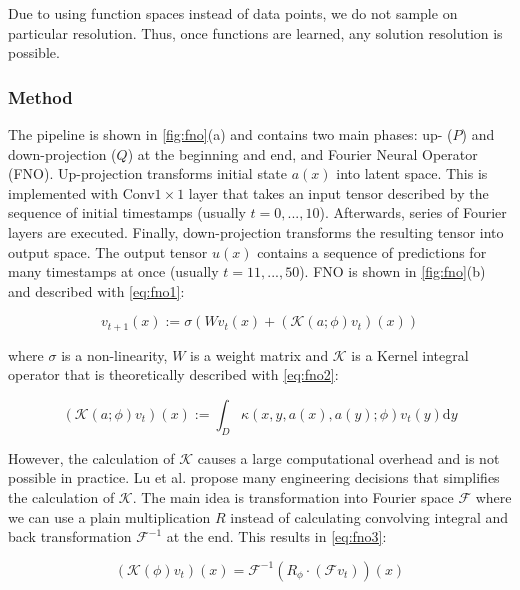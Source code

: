 Due to using function spaces instead of data points, we do not sample on particular resolution. Thus, once functions are learned, any solution resolution is possible. 

\subsubsection{Method}
\label{fno:method}
The pipeline is shown in \cref{fig:fno}(a) and contains two main phases: up- ($P$) and down-projection ($Q$) at the beginning and end, and Fourier Neural Operator (FNO). Up-projection transforms initial state $a(x)$ into latent space. This is implemented with Conv$1\times1$ layer that takes an input tensor described by the sequence of initial timestamps (usually $t=0,...,10$). Afterwards, series of Fourier layers are executed. Finally, down-projection transforms the resulting tensor into output space. The output tensor $u(x)$ contains a sequence of predictions for many timestamps at once (usually $t=11,...,50$). FNO is shown in \cref{fig:fno}(b) and described with \cref{eq:fno1}:

\begin{equation}
v_{t+1}(x):=\sigma\left(W v_{t}(x)+\left(\mathcal{K}(a ; \phi) v_{t}\right)(x)\right)
\label{eq:fno1}
\end{equation}

where $\sigma$ is a non-linearity, $W$ is a weight matrix and $\mathcal{K}$ is a Kernel integral operator that is theoretically described with \cref{eq:fno2}:

\begin{equation}
\left(\mathcal{K}(a ; \phi) v_{t}\right)(x):=\int_{D} \kappa(x, y, a(x), a(y) ; \phi) v_{t}(y) \mathrm{d} y
\label{eq:fno2}
\end{equation}

However, the calculation of $\mathcal{K}$ causes a large computational overhead and is not possible in practice. Lu et al. propose many engineering decisions that simplifies the calculation of $\mathcal{K}$. The main idea is transformation into Fourier space $\mathcal{F}$ where we can use a plain multiplication $R$ instead of calculating convolving integral and back transformation $\mathcal{F}^{-1}$ at the end. This results in \cref{eq:fno3}:

\begin{equation}
\left(\mathcal{K}(\phi) v_{t}\right)(x)=\mathcal{F}^{-1}\left(R_{\phi} \cdot\left(\mathcal{F} v_{t}\right)\right)(x)
\label{eq:fno3}
\end{equation}

